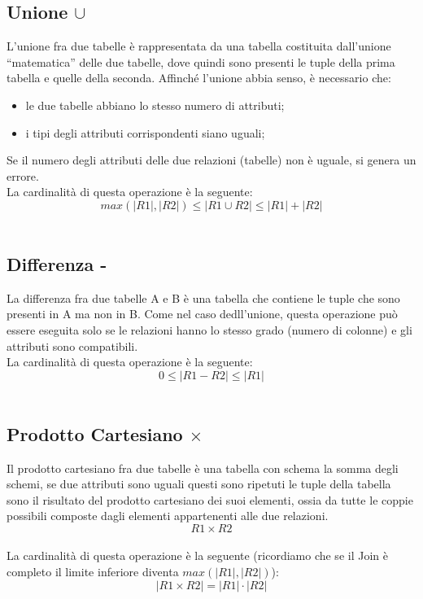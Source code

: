 \documentclass{report}
\begin{document}
\subsection{Unione $\cup$}
L’unione fra due tabelle è rappresentata da una tabella costituita dall’unione “matematica” delle due tabelle, dove quindi sono presenti le tuple della prima tabella e quelle della seconda. Affinché l’unione abbia senso, è necessario che:
\begin{itemize}
    \item le due tabelle abbiano lo stesso numero di attributi;
    \item i tipi degli attributi corrispondenti siano uguali;
\end{itemize}
Se il numero degli attributi delle due relazioni (tabelle) non è uguale, si genera un errore.\\
La cardinalità di questa operazione è la seguente:\\
$$max(|R1|, |R2|) \leq |R1 \cup R2| \leq |R1| + |R2|$$\\

\subsection{Differenza -}
La differenza fra due tabelle A e B è una tabella che contiene le tuple che sono presenti in A ma non in
B. Come nel caso dedll'unione, questa operazione può essere eseguita solo se le relazioni hanno lo stesso grado (numero di colonne) e gli attributi sono compatibili.\\
La cardinalità di questa operazione è la seguente:\\
$$0 \leq |R1 - R2| \leq |R1|$$\\

\subsection{Prodotto Cartesiano $\times$}
Il prodotto cartesiano fra due tabelle è una tabella con schema la somma degli schemi, se due attributi
sono uguali questi sono ripetuti le tuple della tabella sono il risultato del prodotto cartesiano dei suoi elementi, ossia da tutte le coppie possibili composte dagli elementi appartenenti alle due relazioni.\\
$$R1\times R2$$\\
La cardinalità di questa operazione è la seguente (ricordiamo che se il Join è completo il limite inferiore diventa $max(|R1|,|R2|)$):\\
$$|R1 \times R2| = |R1| \cdot |R2|$$\\
\end{document}
